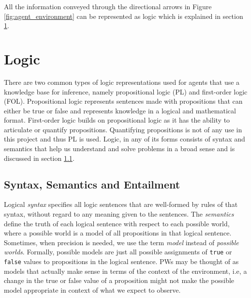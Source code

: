 All the information conveyed through the directional arrows in Figure \ref{fig:agent_environment} can be represented as logic which is explained in section \ref{sec:prop_logic}.


\section{Logic}
\label{sec:prop_logic}

There are two common types of logic representations used for agents that use a knowledge base for inference, namely propositional logic (PL) and first-order logic (FOL). Propositional logic represents sentences made with propositions that can either be true or false and represents knowledge in a logical and mathematical format. First-order logic builds on propositional logic as it has the ability to articulate or quantify propositions. Quantifying propositions is not of any use in this project and thus PL is used. Logic, in any of its forms consists of syntax and semantics that help us understand and solve problems in a broad sense and is discussed in section \ref{syntax_semantics}.


\subsection{Syntax, Semantics and Entailment}
\label{syntax_semantics}

Logical \textit{syntax} specifies all logic sentences that are well-formed by rules of that syntax, without regard to any meaning given to the sentences.
The \textit{semantics} define the truth of each logical sentence with respect to each possible world, where a possible world is a model of all propositions in that logical sentence. Sometimes, when precision is needed, we use the term \textit{model} instead of \textit{possible worlds}. Formally, possible models are just all possible assignments of \texttt{true} or \texttt{false} values to propositions in the logical sentence. PWs may be thought of as models that actually make sense in terms of the context of the environment, i.e, a change in the true or false value of a proposition might not make the possible model appropriate in context of what we expect to observe.

